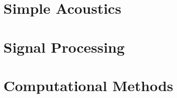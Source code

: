 \documentclass{book}
\begin{document}
\tableofcontents

\chapter{Simple Acoustics}





\chapter{Signal Processing}







\chapter{Computational Methods}




\end{document}
